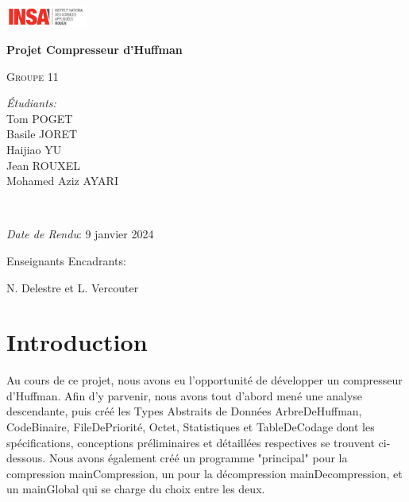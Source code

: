 \documentclass{article}
\begin{document}
\begin{titlepage}
    \begin{flushleft}
        \includegraphics[width=0.2\textwidth]{./Visuels/Logo_INSA_Rouen.jpg}\par\vspace{1cm}
    \end{flushleft}
    \centering
    \vspace{1cm}
    {\huge\bfseries Projet Compresseur d'Huffman\par}
    \vspace{1cm}
    {\scshape\Large Groupe 11\par}
    \bigbreak
    \bigbreak
    \bigbreak
    \bigbreak
    \bigbreak
    \bigbreak
    \bigbreak
    \bigbreak
    
    \begin{minipage}{0.5\textwidth}
    \center
    
    \emph{Étudiants:}\\
    Tom \textsc{POGET}\\
    Basile \textsc{JORET}\\
    Haijiao \textsc{YU}\\
    Jean \textsc{ROUXEL}\\
    Mohamed Aziz \textsc{AYARI}\\
    \end{minipage}\\[2cm]

    \center
    \vspace{1cm}
    {\Large \emph{Date de Rendu}: 9 janvier 2024\par}
    \vspace{1cm}
    {\Large Enseignants Encadrants: \par}
    {\large N. Delestre et L. Vercouter\par}
    \vfill
\end{titlepage}

\setcounter{page}{1}

\tableofcontents

\newpage
\section*{Introduction}
	Au cours de ce projet, nous avons eu l'opportunité de développer un compresseur d'Huffman. Afin d'y parvenir, nous avons tout d'abord mené une analyse descendante, puis créé les Types Abstraits de Données ArbreDeHuffman, CodeBinaire, FileDePriorité, Octet, Statistiques et TableDeCodage dont les spécifications, conceptions préliminaires et détaillées respectives se trouvent ci-dessous. Nous avons également créé un programme "principal" pour la compression mainCompression, un pour la décompression mainDecompression, et un mainGlobal qui se charge du choix entre les deux.
	
\end{document}
